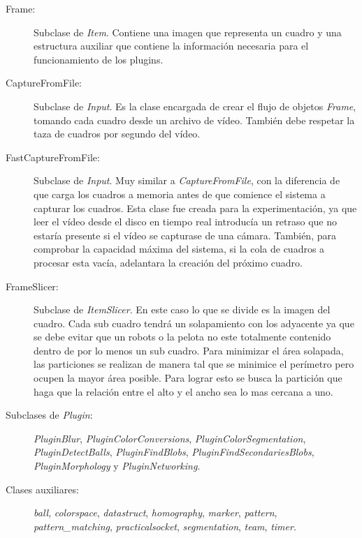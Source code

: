 \begin{description}

\item[Frame:] Subclase de \emph{Item}. Contiene una imagen que representa un
	cuadro y una estructura auxiliar que contiene la información necesaria
	para el funcionamiento de los plugins.

\item[CaptureFromFile:] Subclase de \emph{Input}. Es la clase encargada de crear
	el flujo de objetos \emph{Frame}, tomando cada cuadro desde un archivo
	de vídeo. También debe respetar la taza de cuadros por segundo del
	vídeo.

\item[FastCaptureFromFile:] Subclase de \emph{Input}. Muy similar a
	\emph{CaptureFromFile}, con la diferencia de que carga los cuadros a
	memoria antes de que comience el sistema a capturar los cuadros. Esta
	clase fue creada para la experimentación, ya que leer el vídeo desde el
	disco en tiempo real introducía un retraso que no estaría presente si el
	vídeo se capturase de una cámara. También, para comprobar la capacidad
	máxima del sistema, si la cola de cuadros a procesar esta vacía,
	adelantara la creación del próximo cuadro.

\item[FrameSlicer:] Subclase de \emph{ItemSlicer}. En este caso lo que se divide
	es la imagen del cuadro. Cada sub cuadro tendrá un solapamiento con los
	adyacente ya que se debe evitar que un robots o la pelota no este
	totalmente contenido dentro de por lo menos un sub cuadro. Para
	minimizar el área solapada, las particiones se realizan de manera tal
	que se minimice el perímetro pero ocupen la mayor área posible. Para
	lograr esto se busca la partición que haga que la relación entre el alto
	y el ancho sea lo mas cercana a uno.

\item[Subclases de \emph{Plugin}:] \emph{PluginBlur},
	\emph{PluginColorConversions}, \emph{PluginColorSegmentation},
	\emph{PluginDetectBalls}, \emph{PluginFindBlobs},
	\emph{PluginFindSecondariesBlobs}, \emph{PluginMorphology} y
	\emph{PluginNetworking}.

\item[Clases auxiliares:] \emph{ball}, \emph{colorspace}, \emph{datastruct},
	\emph{homography}, \emph{marker}, \emph{pattern},
	\emph{pattern\_matching}, \emph{practicalsocket}, \emph{segmentation},
	\emph{team}, \emph{timer}.

\end{description}

